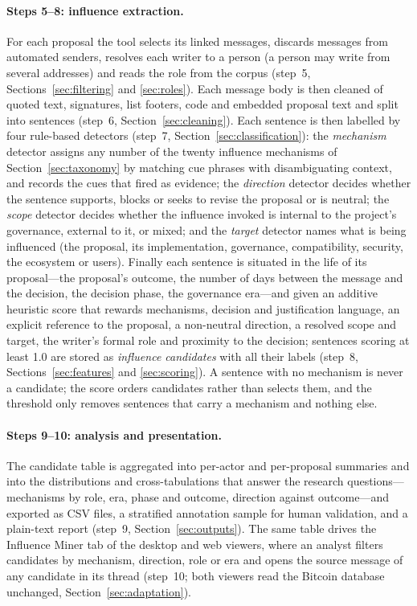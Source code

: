 \documentclass[sigconf,screen]{acmart}
\begin{document}
\paragraph{Steps 5--8: influence extraction.} For each proposal the tool selects its linked messages, discards messages from automated senders, resolves each writer to a person (a person may write from several addresses) and reads the role from the corpus (step~5, Sections~\ref{sec:filtering} and \ref{sec:roles}). Each message body is then cleaned of quoted text, signatures, list footers, code and embedded proposal text and split into sentences (step~6, Section~\ref{sec:cleaning}). Each sentence is then labelled by four rule-based detectors (step~7, Section~\ref{sec:classification}): the \emph{mechanism} detector assigns any number of the twenty influence mechanisms of Section~\ref{sec:taxonomy} by matching cue phrases with disambiguating context, and records the cues that fired as evidence; the \emph{direction} detector decides whether the sentence supports, blocks or seeks to revise the proposal or is neutral; the \emph{scope} detector decides whether the influence invoked is internal to the project's governance, external to it, or mixed; and the \emph{target} detector names what is being influenced (the proposal, its implementation, governance, compatibility, security, the ecosystem or users). Finally each sentence is situated in the life of its proposal---the proposal's outcome, the number of days between the message and the decision, the decision phase, the governance era---and given an additive heuristic score that rewards mechanisms, decision and justification language, an explicit reference to the proposal, a non-neutral direction, a resolved scope and target, the writer's formal role and proximity to the decision; sentences scoring at least 1.0 are stored as \emph{influence candidates} with all their labels (step~8, Sections~\ref{sec:features} and \ref{sec:scoring}). A sentence with no mechanism is never a candidate; the score orders candidates rather than selects them, and the threshold only removes sentences that carry a mechanism and nothing else.

\paragraph{Steps 9--10: analysis and presentation.} The candidate table is aggregated into per-actor and per-proposal summaries and into the distributions and cross-tabulations that answer the research questions---mechanisms by role, era, phase and outcome, direction against outcome---and exported as CSV files, a stratified annotation sample for human validation, and a plain-text report (step~9, Section~\ref{sec:outputs}). The same table drives the Influence Miner tab of the desktop and web viewers, where an analyst filters candidates by mechanism, direction, role or era and opens the source message of any candidate in its thread (step~10; both viewers read the Bitcoin database unchanged, Section~\ref{sec:adaptation}).
\end{document}
